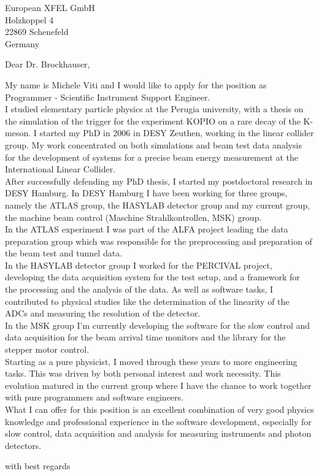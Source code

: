 \documentclass[ebner,paper=a4,fontsize=11pt,ngerman,BCOR=10mm]{scrlttr2}%
\begin{document}
\pagestyle{empty}

\begin{letter}{European XFEL GmbH \\
Holzkoppel 4 \\
22869 Schenefeld \\
Germany}


\setlength{\parindent}{15pt}

\opening{Dear Dr. Brockhauser,}

My name is Michele Viti and I would like to apply for the position as Programmer
- Scientific Instrument Support Engineer.\\
\indent I studied elementary particle physics at the Perugia university, with a
thesis on the simulation of the trigger for the experiment KOPIO on a rare decay of
the K-meson. I started my PhD in 2006 in DESY Zeuthen, working in the linear
collider group. My work concentrated on both simulations and beam test data
analysis for the development of systems for a precise beam energy measurement
at the International Linear Collider.\\
\indent After successfully defending my PhD thesis, I started my postdoctoral
research in DESY Hamburg. In DESY Hamburg I have been working for three groups, namely
the ATLAS group, the HASYLAB detector group and my current group, the machine
beam control (Maschine Strahlkontrollen, MSK) group.\\
In the ATLAS experiment I was part of the ALFA project leading the data
preparation group which was responsible for the preprocessing and preparation of
the beam test and tunnel data.  \\
In the HASYLAB detector group I worked for the PERCIVAL project,
developing the data acquisition system for the test setup, and a framework for the processing
and the analysis of the data. As well as software tasks, I contributed to
physical studies like the determination of the linearity of the ADCs and
measuring the resolution of the detector.\\ 
In the MSK group I'm currently developing the software for the slow
control and data acquisition for the beam arrival time monitors and the library for the
stepper motor control.\\
\indent Starting as a pure physicist, I moved through these years to more
engineering tasks. This was driven by both personal interest and work necessity. This
evolution matured in the current group where I have the chance to work
together with pure programmers and software engineers.\\
\indent What I can offer for this position is an excellent combination of very
good physics knowledge and professional experience in the software development,
especially for slow control, data acquisition and analysis for measuring
instruments and photon detectors.

\closing{with best regards}
\enlargethispage{6\baselineskip}

\end{letter}
\end{document}

